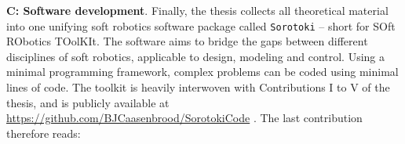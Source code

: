 \textbf{C: Software development}. Finally, the thesis collects all theoretical material into one unifying soft robotics software package called \texttt{Sorotoki} -- short for SOft RObotics TOolKIt. The software aims to bridge the gaps between different disciplines of soft robotics, applicable to design, modeling and control. Using a minimal programming framework, complex problems can be coded using minimal lines of code. The toolkit is heavily interwoven with Contributions I to V of the thesis, and is publicly available at \url{https://github.com/BJCaasenbrood/SorotokiCode} \cite{SorotokiCode}. The last contribution therefore reads: 

